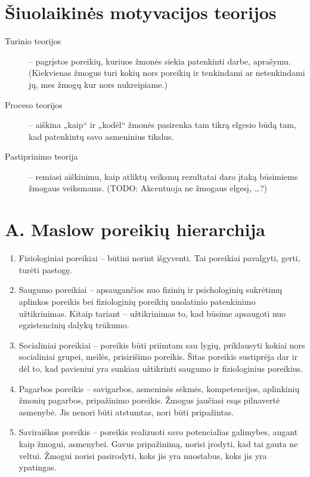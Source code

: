 \section{Šiuolaikinės motyvacijos teorijos}

\begin{description}
  \item[Turinio teorijos] – pagrįstos poreikių, kuriuos žmonės siekia 
    patenkinti darbe, aprašymu. (Kiekvienas žmogus turi kokių nors
    poreikių ir tenkindami ar netenkindami jų, mes žmogų kur nors
    nukreipiame.)
  \item[Proceso teorijos] – aiškina „kaip“ ir „kodėl“ žmonės pasirenka
    tam tikrą elgesio būdą tam, kad patenkintų savo asmeninius tikslus.
  \item[Pastiprinimo teorija] – remiasi aiškinimu, kaip atliktų
    veiksmų rezultatai daro įtaką būsimiems žmogaus veiksmams. (TODO:
    Akcentuoja ne žmogaus elgesį, …?)
\end{description}

\section{A. Maslow poreikių hierarchija}

\label{sec:maslow}

\begin{enumerate}
  \item Fiziologiniai poreikiai – būtini norint išgyventi. Tai poreikiai
    pavalgyti, gerti, turėti pastogę.
  \item Saugumo poreikiai – apsaugančios nuo fizinių ir psichologinių
    sukrėtimų aplinkos poreikis bei fiziologinių poreikių nuolatinio
    patenkinimo užtikrinimas. Kitaip tariant – užtikrinimas to, kad
    būsime apsaugoti nuo egzistencinių dalykų trūkumo.
  \item Socialiniai poreikiai – poreikis būti priimtam sau lygių,
    priklausyti kokiai nors socialiniai grupei, meilės, prisirišimo
    poreikis. Šitas poreikis sustiprėja dar ir dėl to, kad pavieniui
    yra sunkiau užtikrinti saugumo ir fiziologinius poreikius.
  \item Pagarbos poreikis – savigarbos, asmeninės sėkmės, kompetencijos,
    aplinkinių žmonių pagarbos, pripažinimo poreikis. Žmogus jaučiasi
    esąs pilnavertė asmenybė. Jis nenori būti atstumtas, nori būti
    pripažintas.
  \item Saviraiškos poreikis – poreikis realizuoti savo potencialias
    galimybes, augant kaip žmogui, asmenybei. Gavus pripažinimą, norisi
    įrodyti, kad tai gauta ne veltui. Žmogui norisi pasirodyti, koks
    jis yra nuostabus, koks jis yra ypatingas.
\end{enumerate}

